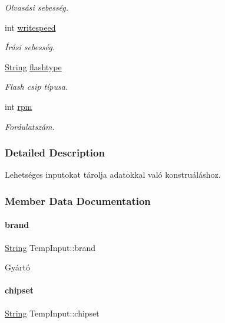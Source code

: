 \begin{DoxyCompactItemize}
\begin{DoxyCompactList}\small\item\em Olvasási sebesség. \end{DoxyCompactList}\item 
int \mbox{\hyperlink{struct_temp_input_a3d5511c959e7c3531ce3bea3a6248d62}{writespeed}}
\begin{DoxyCompactList}\small\item\em Írási sebesség. \end{DoxyCompactList}\item 
\mbox{\hyperlink{class_string}{String}} \mbox{\hyperlink{struct_temp_input_aca0d9830369aab845fc274c6b54ffe33}{flashtype}}
\begin{DoxyCompactList}\small\item\em Flash csip típusa. \end{DoxyCompactList}\item 
int \mbox{\hyperlink{struct_temp_input_a661104db14326156bbb2ffa5a7c6f468}{rpm}}
\begin{DoxyCompactList}\small\item\em Fordulatszám. \end{DoxyCompactList}\end{DoxyCompactItemize}


\subsubsection{Detailed Description}
Lehetséges inputokat tárolja adatokkal való konstruáláshoz. 

\subsubsection{Member Data Documentation}
\mbox{\label{struct_temp_input_ae61ec1c3c483e583e4975e5c728e4886}} 
\paragraph{\texorpdfstring{brand}{brand}}
{\footnotesize\ttfamily \mbox{\hyperlink{class_string}{String}} Temp\+Input\+::brand}



Gyártó 

\mbox{\label{struct_temp_input_a29da394f96dae5eaa49e145207362a9c}} 
\paragraph{\texorpdfstring{chipset}{chipset}}
{\footnotesize\ttfamily \mbox{\hyperlink{class_string}{String}} Temp\+Input\+::chipset}



